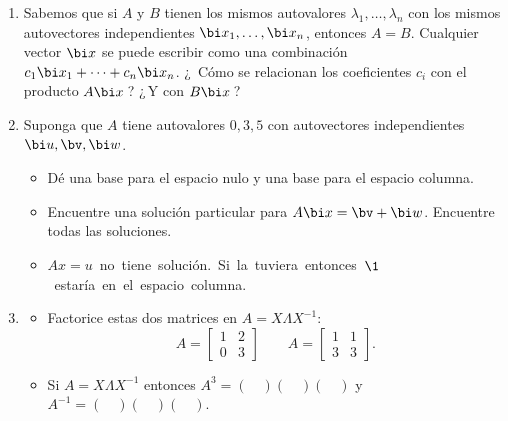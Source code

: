 \begin{enumerate}
\item Sabemos que si $A$ y $B$ tienen los mismos autovalores  $\lambda_1,\dots,\lambda_n$ con los mismos autovectores independientes $\bi  x_1,\dots,\bi x_n$, entonces $A=B$. Cualquier vector $\bi  x$ se puede escribir como una combinación $c_1\bi x_1+\cdots+c_n\bi x_n$. ¿\, Cómo se relacionan los coeficientes $c_i$ con el producto $A\bi x$\,? ¿\,Y con $B\bi x$\,?

\item Suponga que $A$ tiene autovalores $0,3,5$ con autovectores independientes $\bi u,\bv,\bi w$.
%
\begin{itemize}
\item[(a)] Dé una base para el espacio nulo y una base para el espacio columna.
\item[(b)] Encuentre una solución particular para $A\bi x=\bv+\bi w$.  Encuentre todas las soluciones.
\item[(c)] $A x\!=\! u$~no~tiene~solución.~Si~la~tuviera~entonces~$\1$~estaría~en~el~espacio~columna.
\end{itemize}

\item
\begin{itemize}
\item[(a)] Factorice estas dos matrices en $A=X\Lambda X^{-1}$:
  \begin{displaymath}
  A=\begin{bmatrix} 1&2\\ 0&3\end{bmatrix} \qquad A=
  \begin{bmatrix} 1&1\\ 3&3\end{bmatrix}.
\end{displaymath}
\item[(b)] Si $A=X\Lambda X^{-1}$ entonces $A^3=(\quad )(\quad )(\quad )$
  y $A^{-1}=(\quad )(\quad )(\quad )$.
\end{itemize}



\end{enumerate}

